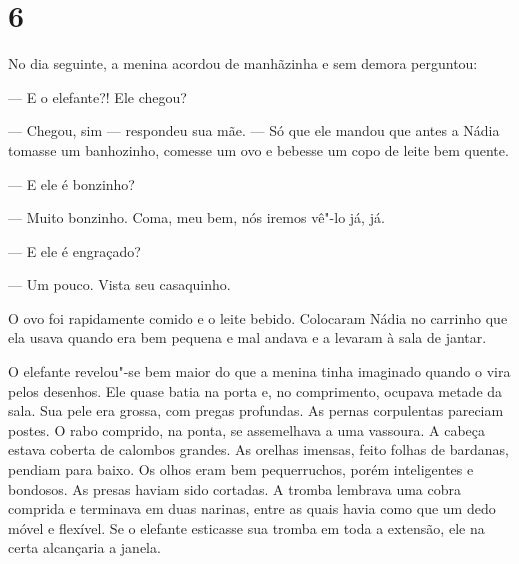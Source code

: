 \section{6}

No dia seguinte, a menina acordou de manhãzinha e sem demora perguntou:

--- E o elefante?! Ele chegou?

--- Chegou, sim --- respondeu sua mãe. --- Só que ele mandou que antes a
Nádia tomasse um banhozinho, co­messe um ovo e bebesse um copo de leite
bem quente.

--- E ele é bonzinho?

--- Muito bonzinho. Coma, meu bem, nós iremos vê"-lo já, já.

--- E ele é engraçado?

--- Um pouco. Vista seu casaquinho.

O ovo foi rapidamente comido e o leite bebido. Colocaram Nádia no
carrinho que ela usava quando era bem pequena e mal andava e a levaram à
sala de jantar.

O elefante revelou"-se bem maior do que a menina tinha imaginado quando o
vira pelos desenhos. Ele qua­se batia na porta e, no comprimento,
ocupava metade da sala. Sua pele era grossa, com pregas profundas. As
pernas corpulentas pareciam postes. O rabo compri­do, na ponta, se
assemelhava a uma vassoura. A ca­beça estava coberta de calombos
grandes. As orelhas imensas, feito folhas de bardanas, pendiam para
baixo. Os olhos eram bem pequerruchos, porém inteligentes e bondosos. As
presas haviam sido cortadas. A tromba lembrava uma cobra comprida e
terminava em duas narinas, entre as quais havia como que um dedo móvel e
flexível. Se o elefante esticasse sua tromba em toda a extensão, ele na
certa alcançaria a janela.

